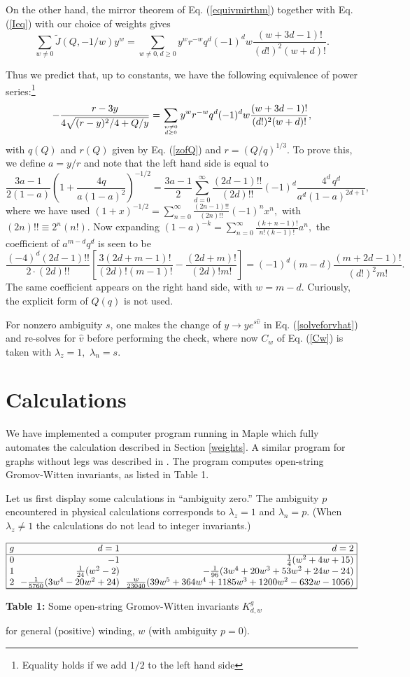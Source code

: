 \documentclass[a4paper,11pt]{article}
\begin{document}
On the other hand, the mirror theorem of
Eq. \!(\ref{equivmirthm}) together with
Eq. \!(\ref{Ieq}) with our choice of weights
gives
$$\sum_{w\neq 0} 
\widetilde{J}(Q,-1/w)y^w=
\sum_{w\neq 0,d\geq 0} y^w r^{-w} q^d (-1)^d w
\frac{(w+3d-1)!}{(d!)^2(w+d)!}.$$

Thus we predict that, up to constants, we have the
following equivalence of power series:\footnote{Equality
holds if we add $1/2$ to the left hand side}
$$-\frac{r-3y}{4\sqrt{(r-y)^2/4 + Q/y}}=
\sum_{w\neq 0\atop d\geq 0}
y^w r^{-w} q^d (-1)^d w
\frac{(w+3d-1)!}{(d!)^2(w+d)!},
$$
with $q(Q)$ and $r(Q)$ given by Eq. \!(\ref{zofQ})
and $r = (Q/q)^{1/3}.$
To prove this, we define $a=y/r$ and note that the
left hand side is equal to
$$\frac{3a-1}{2(1-a)}\left(1+\frac{4q}{a(1-a)^2}\right)^{-1/2}
= \frac{3a-1}{2}\sum_{d=0}^{\infty}\frac{(2d-1)!!}{(2d)!!}
(-1)^d\frac{4^d\,q^d}{a^d(1-a)^{2d+1}},$$
where we have used $(1+x)^{-1/2}=\sum_{n=0}^\infty
\frac{(2n-1)!!}{(2n)!!}(-1)^nx^n,$ with $(2n)!!\equiv
2^n(n!).$  Now expanding $(1-a)^{-k} = \sum_{n=0}^\infty
\frac{(k+n-1)!}{n!(k-1)!}a^n,$
the coefficient of $a^{m-d}q^d$ is seen to be
$$\frac{(-4)^d(2d-1)!!}{2\cdot (2d)!!}
\left[\frac{3(2d+m-1)!}{(2d)!(m-1)!}-
\frac{(2d+m)!}{(2d)!m!}\right]=
(-1)^d(m-d)\frac{(m+2d-1)!}{(d!)^2 m!}.$$
The same coefficient appears on the right hand side,
with $w=m-d.$
Curiously, the explicit form of $Q(q)$ is not used.

For nonzero ambiguity $s$, one makes the
change of $y \rightarrow ye^{s\hat{v}}$
in Eq. (\ref{solveforvhat}) and re-solves for $\hat v$
before performing the check, where now $C_w$ of Eq. (\ref{Cw})
is taken with $\lambda_z=1,$ $\lambda_n=s$. 
\section{Calculations}

We have implemented a computer program running in Maple
which fully automates the calculation described
in Section \ref{weights}.
A similar program for graphs without legs was
described in \cite{KZ}.  The program
computes open-string Gromov-Witten invariants,
as listed in Table 1.

Let us first display some calculations in ``ambiguity zero.''
The ambiguity $p$ encountered in physical calculations
corresponds to $\lambda_z = 1$ and  $\lambda_n = p.$
(When $\lambda_z \neq 1$ the calculations do not lead to
integer invariants.) 

\vskip 0.2in


{\vbox{
$$
\vbox{\offinterlineskip\tabskip=0pt
\halign{\strut
\vrule#&
&\hfil ~$#$
&\hfil ~$#$
&\hfil ~$#$
&\vrule#\cr
\noalign{\hrule}
&g
&d=1
&d=2
&
\cr
\noalign{\hrule}
&0
&-1
&\frac{1}{4}(w^2 + 4w + 15)
&\cr
&1
&\frac{1}{24}(w^2 - 2)
&-\frac{1}{96}(3w^4 + 20w^3 + 53w^2 + 24w - 24)
&\cr
&2
&-\frac{1}{5760}(3w^4-20w^2+24)
&\frac{w}{23040}(39w^5+364w^4+1185w^3+1200w^2-632w-1056)
&\cr
\noalign{\hrule}}\hrule}$$}
\centerline{{\bf Table 1:} Some
open-string Gromov-Witten invariants $K^g_{d,w}$} 
\centerline{for general (positive)
winding, $w$
(with ambiguity $p=0$).}
\vskip7pt}
\end{document}
